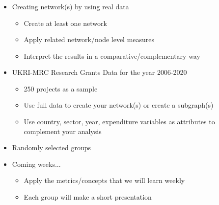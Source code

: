 \documentclass[8pt]{beamer}
\begin{document}

\bgroup
{}
\begin{frame}[plain]{}
\begin{center}
\color{white}{\Huge\insertsection}
\end{center}
\end{frame}
\egroup



\begin{frame}
\frametitle{\insertsection}

\begin{itemize}

\item {Creating network(s) by using real data}
	\begin{itemize}
	\item Create at least one network
	\item Apply related network/node level measures
	\item Interpret the results in a comparative/complementary way
	\end{itemize}

\medskip

\item {UKRI-MRC Research Grants Data for the year 2006-2020}
	\begin{itemize}
	\item 250 projects as a sample
	\item Use full data to create your network(s) or create a subgraph(s)
       \item Use country, sector, year, expenditure variables as attributes to complement your analysis
	\end{itemize}

\medskip

\item {Randomly selected groups}

\medskip

\item {Coming weeks...}
	\begin{itemize}
	\item Apply the metrics/concepts that we will learn weekly
	\item Each group will make a short presentation
	\end{itemize}


		
\end{itemize}

\end{frame}
\end{document}

